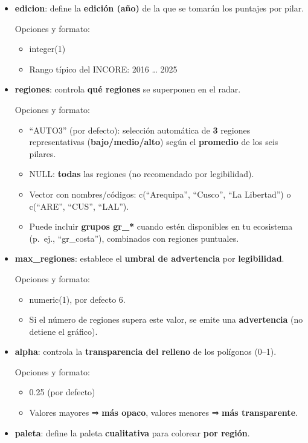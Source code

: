 \documentclass[
  11pt,
  letterpaper,
  DIV=11,
  numbers=noendperiod]{scrartcl}
\begin{document}
\begin{itemize}
\item
  \textbf{edicion}: define la \textbf{edición (año)} de la que se
  tomarán los puntajes por pilar.

  Opciones y formato:

  \begin{itemize}
  \item
    integer(1)
  \item
    Rango típico del INCORE: 2016 \ldots{} 2025
  \end{itemize}
\item
  \textbf{regiones}: controla \textbf{qué regiones} se superponen en el
  radar.

  Opciones y formato:

  \begin{itemize}
  \item
    ``AUTO3'' (por defecto): selección automática de \textbf{3} regiones
    representativas (\textbf{bajo/medio/alto}) según el
    \textbf{promedio} de los seis pilares.
  \item
    NULL: \textbf{todas} las regiones (no recomendado por legibilidad).
  \item
    Vector con nombres/códigos: c(``Arequipa'', ``Cusco'', ``La
    Libertad'') o c(``ARE'', ``CUS'', ``LAL'').
  \item
    Puede incluir \textbf{grupos gr\_*} cuando estén disponibles en tu
    ecosistema (p.~ej., ``gr\_costa''), combinados con regiones
    puntuales.
  \end{itemize}
\item
  \textbf{max\_regiones}: establece el \textbf{umbral de advertencia}
  por \textbf{legibilidad}.

  Opciones y formato:

  \begin{itemize}
  \item
    numeric(1), por defecto 6.
  \item
    Si el número de regiones supera este valor, se emite una
    \textbf{advertencia} (no detiene el gráfico).
  \end{itemize}
\item
  \textbf{alpha}: controla la \textbf{transparencia del relleno} de los
  polígonos (0--1).

  Opciones y formato:

  \begin{itemize}
  \item
    0.25 (por defecto)
  \item
    Valores mayores ⇒ \textbf{más opaco}, valores menores ⇒ \textbf{más
    transparente}.
  \end{itemize}
\item
  \textbf{paleta}: define la paleta \textbf{cualitativa} para colorear
  \textbf{por región}.


\end{itemize}
\end{document}
